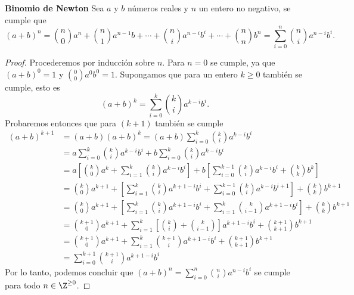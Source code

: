 \begin{theorem.tcb}{\textbf{Binomio de Newton}}{}
    Sea $a$ y $b$ números reales y $n$ un entero no negativo, se cumple que
    \[
        (a + b)^n = \binom{n}{0}a^n + \binom{n}{1}a^{n - 1}b + \cdots + \binom{n}{i}a^{n - i}b^i + \cdots + \binom{n}{n}b^n =
        \sum\limits_{i = 0}^{n} \binom{n}{i}a^{n - i}b^i.
    \]
\end{theorem.tcb}

\begin{proof}
    Procederemos por inducción sobre $n$.
    Para $n = 0$ se cumple, ya que $(a + b)^0 = 1$ y $\binom{0}{0}a^0 b^0 = 1$.
    Supongamos que para un entero $k \geq 0$ también se cumple, esto es
    \[
        (a + b)^k = \sum\limits_{i = 0}^{k} \binom{k}{i}a^{k - i}b^i.
    \]
    Probaremos entonces que para $(k + 1)$ también se cumple
    \begin{align*}
    (a + b)
        ^{k + 1} &= (a + b)(a + b)^k = (a + b) \sum\limits_{i = 0}^{k} \binom{k}{i}a^{k - i}b^i\\
        &= a\sum\limits_{i = 0}^{k} \binom{k}{i}a^{k - i}b^i + b\sum\limits_{i = 0}^{k} \binom{k}{i}a^{k - i}b^i\\[2mm]
        &= a\left[\binom{k}{0}a^{k} + \sum\limits_{i = 1}^{k} \binom{k}{i}a^{k - i}b^i\right] + b\left[\sum\limits_{i = 0}^{k - 1} \binom{k}{i}a^{k - i}b^i + \binom{k}{k}b^k\right]\\[2mm]
        &= \binom{k}{0}a^{k + 1} + \left[\sum\limits_{i = 1}^{k} \binom{k}{i}a^{k + 1 - i}b^i+ \sum\limits_{i = 0}^{k - 1} \binom{k}{i}a^{k - i}b^{i + 1}\right] + \binom{k}{k}b^{k + 1} \\[2mm]
        &= \binom{k}{0}a^{k + 1} + \left[\sum\limits_{i = 1}^{k} \binom{k}{i}a^{k + 1 - i}b^i+ \sum\limits_{i = 1}^{k} \binom{k}{i - 1}a^{k + 1 - i}b^{i}\right] + \binom{k}{k}b^{k + 1} \\[2mm]
        &= \binom{k + 1}{0}a^{k + 1} + \sum\limits_{i = 1}^{k} \left[ \binom{k}{i} + \binom{k}{i - 1}\right] a^{k + 1 - i}b^i + \binom{k + 1}{k + 1}b^{k + 1} \\[2mm]
        &= \binom{k + 1}{0}a^{k + 1} + \sum\limits_{i = 1}^{k} \binom{k + 1}{i} a^{k + 1 - i}b^i + \binom{k + 1}{k + 1}b^{k + 1} \\[2mm]
        &= \boxed{\sum\limits_{i = 0}^{k + 1} \binom{k + 1}{i} a^{k + 1 - i}b^i}
    \end{align*}
    Por lo tanto, podemos concluir que $(a + b)^n = \sum\limits_{i = 0}^{n} \binom{n}{i}a^{n - i}b^i$ se cumple para todo $n \in \Z^{\geq 0}$.
\end{proof}

